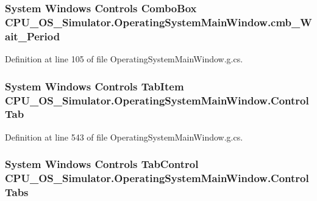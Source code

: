 \subsubsection[{cmb\+\_\+\+Wait\+\_\+\+Period}]{\setlength{\rightskip}{0pt plus 5cm}System Windows Controls Combo\+Box C\+P\+U\+\_\+\+O\+S\+\_\+\+Simulator.\+Operating\+System\+Main\+Window.\+cmb\+\_\+\+Wait\+\_\+\+Period\hspace{0.3cm}{\ttfamily [package]}}\label{class_c_p_u___o_s___simulator_1_1_operating_system_main_window_a4da0c086d71c3b794c9cd816aafeac88}


Definition at line 105 of file Operating\+System\+Main\+Window.\+g.\+cs.

\hypertarget{class_c_p_u___o_s___simulator_1_1_operating_system_main_window_a06541ab6c749adc4696fe5ec1f174fcf}{}
\subsubsection[{Control\+Tab}]{\setlength{\rightskip}{0pt plus 5cm}System Windows Controls Tab\+Item C\+P\+U\+\_\+\+O\+S\+\_\+\+Simulator.\+Operating\+System\+Main\+Window.\+Control\+Tab\hspace{0.3cm}{\ttfamily [package]}}\label{class_c_p_u___o_s___simulator_1_1_operating_system_main_window_a06541ab6c749adc4696fe5ec1f174fcf}


Definition at line 543 of file Operating\+System\+Main\+Window.\+g.\+cs.

\hypertarget{class_c_p_u___o_s___simulator_1_1_operating_system_main_window_aad49944b6a55d895806ca01be83440e7}{}
\subsubsection[{Control\+Tabs}]{\setlength{\rightskip}{0pt plus 5cm}System Windows Controls Tab\+Control C\+P\+U\+\_\+\+O\+S\+\_\+\+Simulator.\+Operating\+System\+Main\+Window.\+Control\+Tabs\hspace{0.3cm}{\ttfamily [package]}}\label{class_c_p_u___o_s___simulator_1_1_operating_system_main_window_aad49944b6a55d895806ca01be83440e7}


